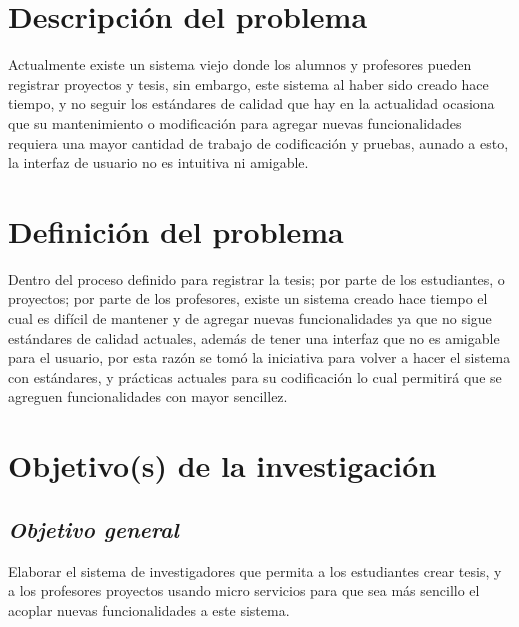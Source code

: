 
\section{Descripción del problema} \label{descripcionproblema}

    Actualmente existe un sistema viejo donde los alumnos y profesores pueden registrar proyectos y tesis, sin embargo, este sistema al haber sido creado hace tiempo, y no seguir los estándares de calidad que hay en la actualidad ocasiona que su mantenimiento o modificación para agregar nuevas funcionalidades requiera una mayor cantidad de trabajo de codificación y pruebas, aunado a esto, la interfaz de usuario no es intuitiva ni amigable.

\section{Definición del problema} \label{definicionproblema}
    
    Dentro del proceso definido para registrar la tesis; por parte de los estudiantes, o proyectos; por parte de los profesores, existe un sistema creado hace tiempo el cual es difícil de mantener y de agregar nuevas funcionalidades ya que no sigue estándares de calidad actuales, además de tener una interfaz que no es amigable para el usuario, por esta razón se tomó la iniciativa para volver a hacer el sistema con estándares, y prácticas actuales para su codificación lo cual permitirá que se agreguen funcionalidades con mayor sencillez.

\section{Objetivo(s) de la investigación} \label{objetivoinvestigacion}
    
    \subsection{\textbf{\textit{Objetivo general}}} %
    Elaborar el sistema de investigadores que permita a los estudiantes crear tesis, y a los profesores proyectos usando micro servicios para que sea más sencillo el acoplar nuevas funcionalidades a este sistema.
    
